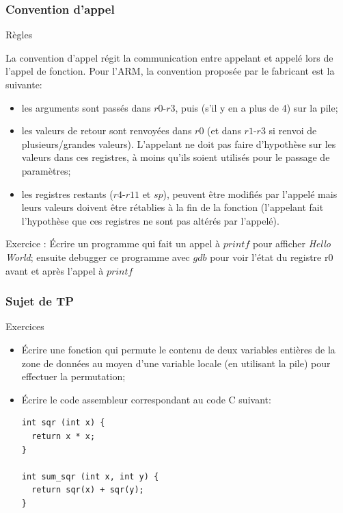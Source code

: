 \documentclass{beamer}
\begin{document}
\begin{frame}
\frametitle{Convention d'appel}

\begin{block}{Règles}

  La convention d'appel régit la communication entre appelant et
  appelé lors de l'appel de fonction. Pour l'ARM, la convention
  proposée par le fabricant est la suivante:
\begin{footnotesize}
\begin{itemize}
\item les arguments sont passés dans $r0$-$r3$, puis (s'il y en a plus
  de 4) sur la pile;
\item les valeurs de retour sont renvoyées dans $r0$ (et dans
  $r1$-$r3$ si renvoi de plusieurs/grandes valeurs). L'appelant ne
  doit pas faire d'hypothèse sur les valeurs dans ces registres, à
  moins qu'ils soient utilisés pour le passage de paramètres;
\item les registres restants ($r4$-$r11$ et $sp$), peuvent être
  modifiés par l'appelé mais leurs valeurs doivent être rétablies à la
  fin de la fonction (l'appelant fait l'hypothèse que ces registres ne
  sont pas altérés par l'appelé).
\end{itemize}
\end{footnotesize} {\color{red}Exercice : Écrire un programme qui fait
  un appel à $printf$ pour afficher \textit{Hello World}; ensuite
  debugger ce programme avec $gdb$ pour voir l'état du registre r0
  avant et après l'appel à $printf$}
\end{block}
\end{frame}

\begin{frame}[fragile]
  \frametitle{Sujet de TP}
  \begin{block}{Exercices}
\begin{itemize}
\item Écrire une fonction qui permute le contenu de deux variables
  entières de la zone de données au moyen d'une variable locale (en
  utilisant la pile) pour effectuer la permutation;

\item Écrire le code assembleur correspondant au code C suivant:

{\small
\begin{lstlisting}[style=C]
int sqr (int x) {
  return x * x;
}

int sum_sqr (int x, int y) {
  return sqr(x) + sqr(y);
}
\end{lstlisting}}
\end{itemize}
\end{block}
\end{frame}
\end{document}
